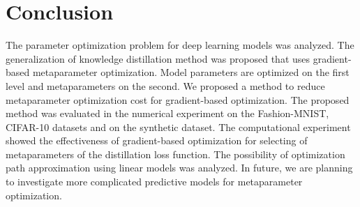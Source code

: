\documentclass[runningheads]{llncs}
\begin{document}
\section{Conclusion}
The parameter optimization problem for deep learning models was analyzed. The generalization of knowledge distillation method was proposed that uses gradient-based metaparameter optimization. Model parameters are optimized on the first level and metaparameters on the second. We proposed a method to reduce metaparameter optimization cost for gradient-based optimization. The proposed method  was evaluated in the numerical experiment on the Fashion-MNIST, CIFAR-10 datasets and on the synthetic dataset. The computational experiment showed the effectiveness of gradient-based optimization for selecting of metaparameters of the distillation loss function. The possibility of optimization path approximation using linear models was analyzed. In future, we are planning to investigate more complicated predictive models for  metaparameter optimization. 





\end{document}
